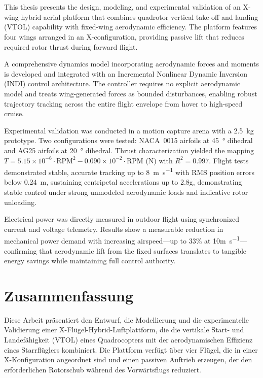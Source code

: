 \chapter{\abstractname}

This thesis presents the design, modeling, and experimental validation of an X-wing hybrid aerial platform that combines quadrotor vertical take-off and landing (VTOL) capability with fixed-wing aerodynamic efficiency. The platform features four wings arranged in an X-configuration, providing passive lift that reduces required rotor thrust during forward flight.

A comprehensive dynamics model incorporating aerodynamic forces and moments is developed and integrated with an Incremental Nonlinear Dynamic Inversion (INDI) control architecture. The controller requires no explicit aerodynamic model and treats wing-generated forces as bounded disturbances, enabling robust trajectory tracking across the entire flight envelope from hover to high-speed cruise.

Experimental validation was conducted in a motion capture arena with a \SI{2.5}{\kilogram} prototype. Two configurations were tested: NACA~0015 airfoils at \SI{45}{\degree} dihedral and AG25 airfoils at \SI{20}{\degree} dihedral. Thrust characterization yielded the mapping $T = 5.15 \times 10^{-6} \cdot \text{RPM}^2 - 0.090 \times 10^{-2} \cdot \text{RPM}$ (N) with $R^2 = 0.997$. Flight tests demonstrated stable, accurate tracking up to \SI{8}{\meter\per\second} with RMS position errors below \SI{0.24}{\meter}, sustaining centripetal accelerations up to 2.8g, demonstrating stable control under strong unmodeled aerodynamic loads and indicative rotor unloading.

Electrical power was directly measured in outdoor flight using synchronized current and voltage telemetry. Results show a measurable reduction in mechanical power demand with increasing airspeed—up to 33\% at 10\si{\meter\per\second}—confirming that aerodynamic lift from the fixed surfaces translates to tangible energy savings while maintaining full control authority. 

\chapter*{Zusammenfassung}

Diese Arbeit präsentiert den Entwurf, die Modellierung und die experimentelle Validierung einer X-Flügel-Hybrid-Luftplattform, die die vertikale Start- und Landefähigkeit (VTOL) eines Quadrocopters mit der aerodynamischen Effizienz eines Starrflüglers kombiniert. Die Plattform verfügt über vier Flügel, die in einer X-Konfiguration angeordnet sind und einen passiven Auftrieb erzeugen, der den erforderlichen Rotorschub während des Vorwärtsflugs reduziert.

